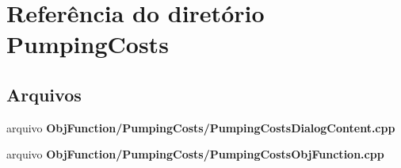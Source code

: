 \section{Referência do diretório Pumping\+Costs}
\label{dir_25d7dd3b1b900f229f477fff675a1147}
\subsection*{Arquivos}
\begin{DoxyCompactItemize}
\item 
arquivo {\bf Obj\+Function/\+Pumping\+Costs/\+Pumping\+Costs\+Dialog\+Content.\+cpp}
\item 
arquivo {\bf Obj\+Function/\+Pumping\+Costs/\+Pumping\+Costs\+Obj\+Function.\+cpp}
\end{DoxyCompactItemize}
